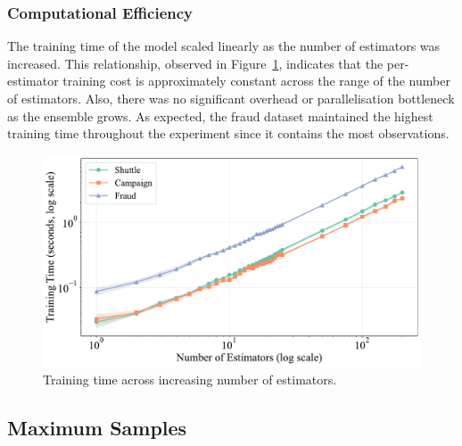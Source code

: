 \documentclass[10pt, conference]{IEEEtran}
\begin{document}
\subsubsection{Computational Efficiency}
The training time of the model scaled linearly as the number of estimators was increased. This relationship, observed in Figure~\ref{fig:n_estimators_tt}, indicates that the per-estimator training cost is approximately constant across the range of the number of estimators. Also, there was no significant overhead or parallelisation bottleneck as the ensemble grows. As expected, the fraud dataset maintained the highest training time throughout the experiment since it contains the most observations.
\begin{figure}[H]
	\centering
	\includegraphics[width=0.95\linewidth]{../results/multi_dataset/n_estimators_training_time.pdf}
	\caption{Training time across increasing number of estimators.}
	\label{fig:n_estimators_tt}
\end{figure}


\subsection{Maximum Samples}
\end{document}
